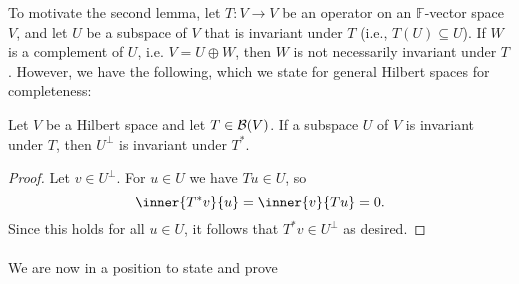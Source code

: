 \documentclass[a4paper, 11pt]{memoir}
\numberwithin{equation}{chapter}
\newcommand{\field}{\mathbb{F}}
\newcommand{\newpar}{\paragraph{}}
\begin{document}
To motivate the second lemma, let $T \colon V \to V$ be an operator on an $\field$-vector space $V$, and let $U$ be a subspace of $V$ that is invariant under $T$ (i.e., $T(U) \subseteq U$). If $W$ is a complement of $U$, i.e. $V = U \oplus W$, then $W$ is not necessarily invariant under $T$. However, we have the following, which we state for general Hilbert spaces for completeness:

\begin{lemma}
    \label{thm:adjoint-invariant-subspace}
    Let $V$ be a Hilbert space and let $T \in \mathcal{B}(V)$. If a subspace $U$ of $V$ is invariant under $T$, then $U^\perp$ is invariant under $T^*$.
\end{lemma}

\begin{proof}
    Let $v \in U^\perp$. For $u \in U$ we have $Tu \in U$, so
    \begin{equation*}
        \inner{T^*v}{u}
            = \inner{v}{Tu}
            = 0.
    \end{equation*}
    Since this holds for all $u \in U$, it follows that $T^*v \in U^\perp$ as desired.
\end{proof}


\newpar

We are now in a position to state and prove
\end{document}
